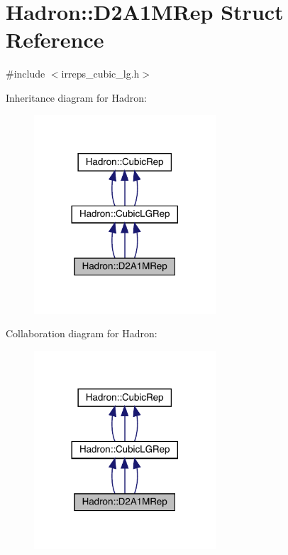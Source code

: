 \hypertarget{structHadron_1_1D2A1MRep}{}\section{Hadron\+:\+:D2\+A1\+M\+Rep Struct Reference}
\label{structHadron_1_1D2A1MRep}


{\ttfamily \#include $<$irreps\+\_\+cubic\+\_\+lg.\+h$>$}



Inheritance diagram for Hadron\+:
\nopagebreak
\begin{figure}[H]
\begin{center}
\leavevmode
\includegraphics[width=192pt]{d7/d12/structHadron_1_1D2A1MRep__inherit__graph}
\end{center}
\end{figure}


Collaboration diagram for Hadron\+:
\nopagebreak
\begin{figure}[H]
\begin{center}
\leavevmode
\includegraphics[width=192pt]{d3/d3d/structHadron_1_1D2A1MRep__coll__graph}
\end{center}
\end{figure}
